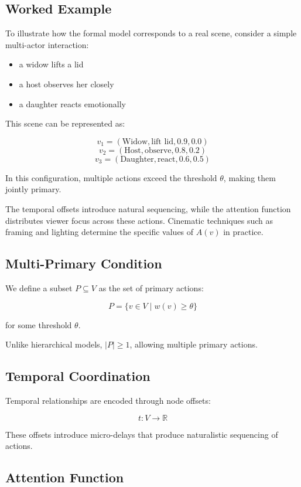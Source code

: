 \documentclass[preprints,article,submit,pdftex,moreauthors,accept]{Definitions/mdpi}
\begin{document}
\subsection{Worked Example}

To illustrate how the formal model corresponds to a real scene, consider a simple multi-actor interaction:

\begin{itemize}
    \item a widow lifts a lid
    \item a host observes her closely
    \item a daughter reacts emotionally
\end{itemize}

This scene can be represented as:

\[
v_1 = (\text{Widow}, \text{lift lid}, 0.9, 0.0)
\]
\[
v_2 = (\text{Host}, \text{observe}, 0.8, 0.2)
\]
\[
v_3 = (\text{Daughter}, \text{react}, 0.6, 0.5)
\]

In this configuration, multiple actions exceed the threshold $\theta$, making them jointly primary.

The temporal offsets introduce natural sequencing, while the attention function distributes viewer focus across these actions. Cinematic techniques such as framing and lighting determine the specific values of $A(v)$ in practice.
\subsection{Multi-Primary Condition}

We define a subset $P \subseteq V$ as the set of primary actions:

\[
P = \{ v \in V \mid w(v) \geq \theta \}
\]

for some threshold $\theta$.

Unlike hierarchical models, $|P| \geq 1$, allowing multiple primary actions.

\subsection{Temporal Coordination}

Temporal relationships are encoded through node offsets:

\[
t: V \rightarrow \mathbb{R}
\]

These offsets introduce micro-delays that produce naturalistic sequencing of actions.

\subsection{Attention Function}
\end{document}
